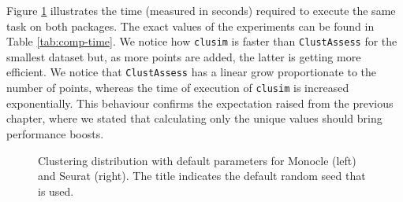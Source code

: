 Figure \ref{fig:comp-time} illustrates the time (measured in seconds) required to execute the same task on both packages. The exact values of the experiments can be found in Table \ref{tab:comp-time}. We notice how \verb|clusim| is faster than \verb|ClustAssess| for the smallest dataset but, as more points are added, the latter is getting more efficient. We notice that \verb|ClustAssess| has a linear grow proportionate to the number of points, whereas the time of execution of \verb|clusim| is increased exponentially. This behaviour confirms the expectation raised from the previous chapter, where we stated that calculating only the unique values should bring performance boosts.


\begin{figure}[H]
    \centering
    \caption{\label{fig:comp-time}Clustering distribution with default parameters for Monocle (left) and Seurat (right). The title indicates the default random seed that is used.}
\end{figure}


\begin{table}[]

\caption{\label{tab:comp-time} Time in seconds}
\end{table}

